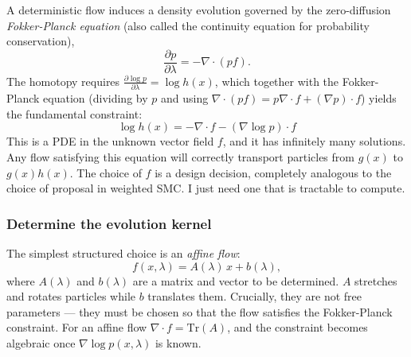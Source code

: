 \documentclass{article}
\begin{document}
A deterministic flow induces a density evolution governed by the zero-diffusion \textit{Fokker-Planck equation} (also called the continuity equation for probability conservation),
\begin{equation}
    \frac{\partial p}{\partial \lambda} = -\nabla \cdot (p f).
\end{equation}
The homotopy requires $\frac{\partial \log p}{\partial \lambda} = \log h(x)$, which together with the Fokker-Planck equation (dividing by $p$ and using $\nabla \cdot(pf) = p\nabla\cdot f + (\nabla p)\cdot f$) yields the fundamental constraint:
\begin{equation}
\boxed{\log h(x) = -\nabla \cdot f - (\nabla \log p) \cdot f}
\end{equation}
This is a PDE in the unknown vector field $f$, and it has infinitely many solutions. Any flow satisfying this equation will correctly transport particles from $g(x)$ to $g(x)h(x)$. The choice of $f$ is a design decision, completely analogous to the choice of proposal in weighted SMC. I just need one that is tractable to compute.

\subsubsection{Determine the evolution kernel}
\label{sec:edh_derivation}
The simplest structured choice is an \textit{affine flow}:
\begin{equation}
    f(x,\lambda) = A(\lambda)\,x + b(\lambda),
\end{equation}
where $A(\lambda)$ and $b(\lambda)$ are a matrix and vector to be determined. $A$ stretches and rotates particles while $b$ translates them. Crucially, they are not free parameters --- they must be chosen so that the flow satisfies the Fokker-Planck constraint. For an affine flow $\nabla \cdot f = \text{Tr}(A)$, and the constraint becomes algebraic once $\nabla \log p(x,\lambda)$ is known.
\end{document}
